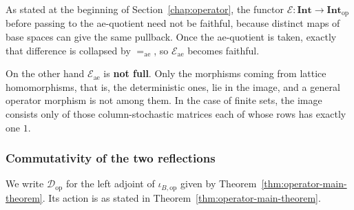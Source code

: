 \begin{remark}\label{rem:E-ae-faithful-not-full}
  As stated at the beginning of Section~\ref{chap:operator}, the functor
  $\mathcal{E}:\mathbf{Int}\to\mathbf{Int}_{\mathrm{op}}$ before passing to the
  ae-quotient need not be faithful, because distinct maps of base spaces can
  give the same pullback.
  Once the ae-quotient is taken, exactly that difference is collapsed by
  $=_{\mathrm{ae}}$, so $\mathcal{E}_{\mathrm{ae}}$ becomes faithful.

  On the other hand $\mathcal{E}_{\mathrm{ae}}$ is \textbf{not full}.
  Only the morphisms coming from lattice homomorphisms, that is, the
  deterministic ones, lie in the image, and a general operator morphism is not
  among them.
  In the case of finite sets, the image consists only of those
  column-stochastic matrices each of whose rows has exactly one $1$.
\end{remark}

\subsubsection{Commutativity of the two reflections}

We write $\mathcal{D}_{\mathrm{op}}$ for the left adjoint of
$\iota_{B,\mathrm{op}}$ given by
Theorem~\ref{thm:operator-main-theorem}.
Its action is as stated in Theorem~\ref{thm:operator-main-theorem}.

